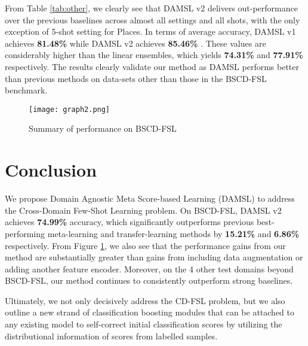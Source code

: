 \documentclass[final]{cvpr}
\begin{document}
From Table \ref{tab:other}, we clearly see that DAMSL v2 delivers out-performance over the previous baselines across almost all settings and all shots, with the only exception of 5-shot setting for Places. In terms of average accuracy, DAMSL v1 achieves \textbf{81.48\%} while DAMSL v2 achieves \textbf{85.46\%} . These values are considerably higher  than the linear ensembles, which yields \textbf{74.31\%} and \textbf{77.91\%} respectively. The results clearly validate our method as DAMSL performs better than previous methods on data-sets other than those in the BSCD-FSL benchmark.

\begin{figure}[t]
\begin{center}
   \texttt{[image: graph2.png]}
\end{center}
   \caption{Summary of performance on BSCD-FSL}
\label{fig:Summary}
\end{figure}

\section{Conclusion}

We propose Domain Agnostic Meta Score-based Learning (DAMSL) to address the Cross-Domain Few-Shot Learning problem. On BSCD-FSL, DAMSL v2 achieves \textbf{74.99\%} accuracy, which significantly outperforms previous best-performing meta-learning and transfer-learning methods by \textbf{15.21\%}  and \textbf{6.86\%} respectively. From Figure \ref{fig:Summary}, we also see that the performance gains from our method are substantially greater than gains from including data augmentation or adding another feature encoder. Moreover, on the 4 other test domains beyond BSCD-FSL, our method continues to consistently outperform strong baselines.

Ultimately, we not only decisively address the CD-FSL problem, but we also outline a new strand of classification boosting modules that can be attached to any existing model to self-correct initial classification scores by utilizing the distributional information of scores from labelled samples.

{\small


}
\end{document}

